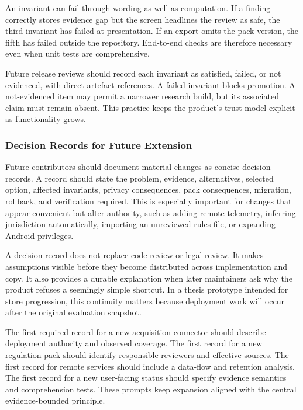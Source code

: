 An invariant can fail through wording as well as computation. If a finding correctly stores evidence gap but the screen headlines the review as safe, the third invariant has failed at presentation. If an export omits the pack version, the fifth has failed outside the repository. End-to-end checks are therefore necessary even when unit tests are comprehensive.

Future release reviews should record each invariant as satisfied, failed, or not evidenced, with direct artefact references. A failed invariant blocks promotion. A not-evidenced item may permit a narrower research build, but its associated claim must remain absent. This practice keeps the product's trust model explicit as functionality grows.

\subsubsection{Decision Records for Future Extension}

Future contributors should document material changes as concise decision records. A record should state the problem, evidence, alternatives, selected option, affected invariants, privacy consequences, pack consequences, migration, rollback, and verification required. This is especially important for changes that appear convenient but alter authority, such as adding remote telemetry, inferring jurisdiction automatically, importing an unreviewed rules file, or expanding Android privileges.

A decision record does not replace code review or legal review. It makes assumptions visible before they become distributed across implementation and copy. It also provides a durable explanation when later maintainers ask why the product refuses a seemingly simple shortcut. In a thesis prototype intended for store progression, this continuity matters because deployment work will occur after the original evaluation snapshot.

The first required record for a new acquisition connector should describe deployment authority and observed coverage. The first record for a new regulation pack should identify responsible reviewers and effective sources. The first record for remote services should include a data-flow and retention analysis. The first record for a new user-facing status should specify evidence semantics and comprehension tests. These prompts keep expansion aligned with the central evidence-bounded principle.
